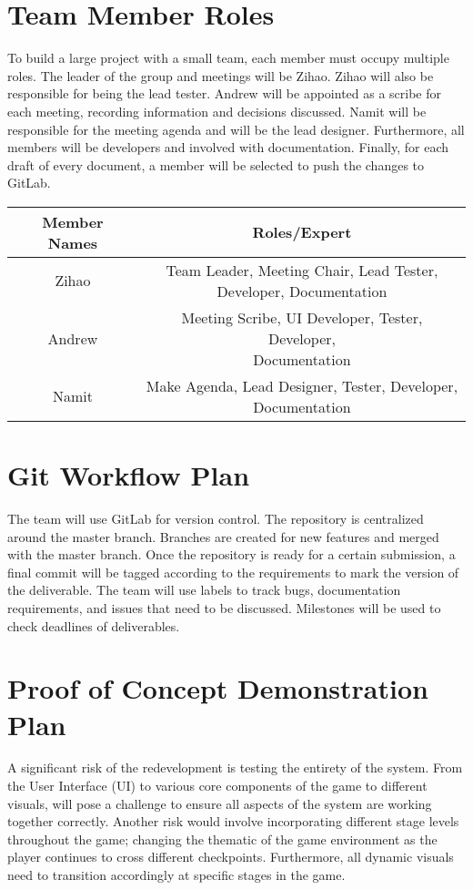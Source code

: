 \documentclass{article}
\begin{document}
\section{Team Member Roles}
To build a large project with a small team, each member must occupy multiple roles. The leader of the group and meetings will be Zihao.
Zihao will also be responsible for being the lead tester. Andrew will be appointed as a scribe for each meeting, recording information and decisions discussed. Namit will be responsible for the meeting agenda and will be the lead designer. Furthermore, all members will be developers and involved with documentation. Finally, for each draft of every document, a member will be selected to push the changes to GitLab.


\begin{table}[h]
    \centering
    \begin{tabular}{|c|c|}
    \hline
         Member Names & Roles/Expert  \\
         \hline
         Zihao & \shortstack{ Team Leader, Meeting Chair,  Lead Tester, \\ Developer, Documentation }\\
         \hline
         Andrew & \shortstack{ Meeting Scribe, UI Developer, Tester, Developer, \\ Documentation}\\
         \hline
         Namit & \shortstack{Make Agenda, Lead Designer, Tester, Developer, \\ Documentation} \\
         \hline
    \end{tabular}
    \label{tab:my_label}
\end{table}

\section{Git Workflow Plan}
The team will use GitLab for version control. The repository is centralized around the master branch. Branches are created for new features and merged with the master branch. Once the repository is ready for a certain submission, a final commit will be tagged according to the requirements to mark the version of the deliverable. The team will use labels to track bugs, documentation requirements, and issues that need to be discussed. Milestones will be used to check deadlines of deliverables.


\section{Proof of Concept Demonstration Plan}
A significant risk of the redevelopment is testing the entirety of the system. From the User Interface (UI) to various core components of the game to different visuals, will pose a challenge to ensure all aspects of the system are working together correctly. Another risk would involve incorporating different stage levels throughout the game; changing the thematic of the game environment as the player continues to cross different checkpoints. Furthermore, all dynamic visuals need to transition accordingly at specific stages in the game.  
\end{document}
